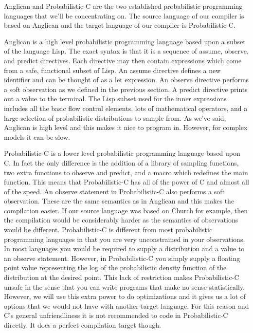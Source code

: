 \documentclass[a4paper]{article}
\begin{document}
Anglican and Probabilistic-C are the two established probabilistic programming languages that we'll be concentrating on. The source language of our compiler is based on Anglican and the target language of our compiler is Probabilistic-C.

Anglican is a high level probabilistic programming language based upon a subset of the language Lisp. The exact syntax is that it is a sequence of assume, observe, and predict directives. Each directive may then contain expressions which come from a safe, functional subset of Lisp. An assume directive defines a new identifier and can be thought of as a let expression. An observe directive performs a soft observation as we defined in the previous section. A predict directive prints out a value to the terminal. The Lisp subset used for the inner expressions includes all the basic flow control elements, lots of mathematical operators, and a large selection of probabilistic distributions to sample from. As we've said, Anglican is high level and this makes it nice to program in. However, for complex models it can be slow.

Probabilistic-C is a lower level probabilistic programming language based upon C. In fact the only difference is the addition of a library of sampling functions, two extra functions to observe and predict, and a macro which redefines the main function. This means that Probabilistic-C has all of the power of C and almost all of the speed. An observe statement in Probabilistic-C also performs a soft observation. These are the same semantics as in Anglican and this makes the compilation easier. If our source language was based on Church for example, then the compilation would be considerably harder as the semantics of observations would be different. Probabilistic-C is different from most probabilistic programming languages in that you are very unconstrained in your observations. In most languages you would be required to supply a distribution and a value to an observe statement. However, in Probabilistic-C you simply supply a floating point value representing the log of the probabilistic density function of the distribution at the desired point. This lack of restriction makes Probabilistic-C unsafe in the sense that you can write programs that make no sense statistically. However, we will use this extra power to do optimizations and it gives us a lot of options that we would not have with another target language. For this reason and C's general unfriendliness it is not recommended to code in Probabilistic-C directly. It does a perfect compilation target though.
\end{document}
